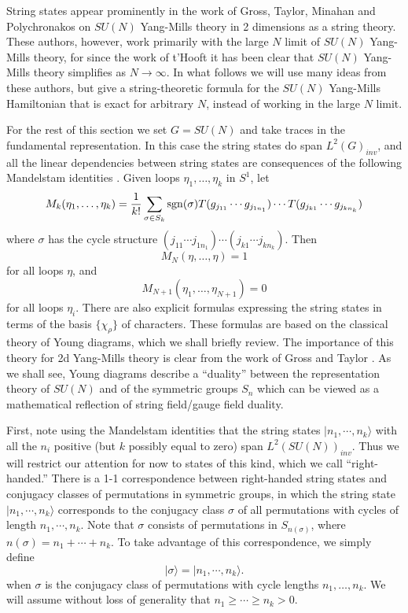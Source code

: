 \documentclass[12pt]{article}
\begin{document}
String states appear prominently in the work of
Gross, Taylor, Minahan and Polychronakos \cite{GT,MP} on
$SU(N)$ Yang-Mills theory in 2 dimensions as a string theory.  These
authors, however, work primarily with the large $N$ limit of $SU(N)$
Yang-Mills theory, for since the
work of t'Hooft \cite{t'Hooft} it has been clear that $SU(N)$ Yang-Mills
theory simplifies as $N \to \infty$.
In what follows we will use many ideas from these authors,
but give a string-theoretic formula
for the $SU(N)$ Yang-Mills Hamiltonian that is exact for arbitrary $N$,
instead of working in the large $N$ limit.

For the rest of this section we set $G = SU(N)$ and take traces in the
fundamental representation.  In this case the string states do span
$L^2(G)_{inv}$, and all the linear dependencies between string states
are consequences of the following Mandelstam identities \cite{GamTri}.
Given loops $\eta_1, \dots, \eta_k$ in $S^1$, let
\[      M_k(\eta_1, \dots, \eta_k) =
{1\over k!} \sum_{\sigma \in S_k} {\rm sgn}(\sigma) T(g_{j_{11}} \cdots
g_{j_{1n_1}}) \cdots T(g_{j_{k1}} \cdots g_{j_{kn_k}}) \]
where $\sigma$ has the cycle structure $(j_{11} \cdots j_{1n_1}) \cdots
(j_{k1} \cdots j_{kn_k})$.  Then
\[       M_N(\eta, \dots, \eta) = 1  \]
for all loops $\eta$, and
\[       M_{N+1}(\eta_1, \dots, \eta_{N+1}) = 0  \]
for all loops $\eta_i$.
There are also explicit formulas expressing the string states in terms
of the basis $\{\chi_\rho\}$ of characters.
These formulas are based on the classical theory of Young diagrams,
which we shall briefly review.
The importance of this theory
for 2d Yang-Mills theory is clear from the work of Gross
and Taylor \cite{Gross,GT}.  As we shall see, Young diagrams describe
a ``duality'' between the representation theory of $SU(N)$ and of the symmetric
groups $S_n$ which can be viewed as a mathematical reflection of string
field/gauge field duality.

First, note using the Mandelstam identities
that the string states $|n_1, \cdots, n_k\rangle$ with all
the $n_i$ positive (but $k$ possibly equal to zero) span
$L^2(SU(N))_{inv}$.  Thus we will restrict our attention for
now to states of this kind, which we call ``right-handed.''
There is a 1-1 correspondence between
right-handed string states and conjugacy classes of
permutations in symmetric groups, in which
the string state $|n_1, \cdots, n_k\rangle$
corresponds to the conjugacy class $\sigma$ of all permutations with cycles
of length $n_1, \cdots, n_k$.
Note that $\sigma$ consists of permutations in $S_{n(\sigma)}$, where
$n(\sigma) = n_1 + \cdots + n_k$.   To take advantage of this
correspondence, we simply define
\[       |\sigma\rangle = |n_1, \cdots, n_k\rangle  .\]
when $\sigma$ is the conjugacy class of permutations with cycle lengths
$n_1, \dots, n_k$.   We will assume without loss of generality that
$n_1 \ge \cdots \ge n_k > 0$.
\end{document}
